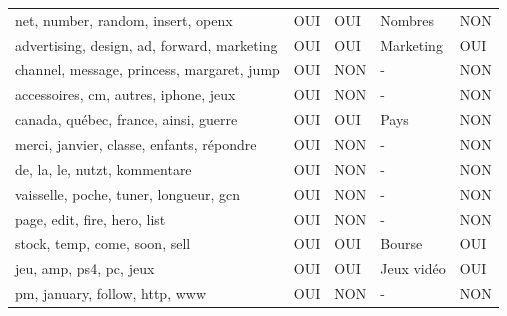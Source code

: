 \begin{longtable}{lllll}
\scriptsize net, number, random, insert, openx                 & \cellcolor[HTML]{9AFF99}OUI & \cellcolor[HTML]{9AFF99}OUI & Nombres                   & \cellcolor[HTML]{FFCCC9}NON \\
\scriptsize advertising, design, ad, forward, marketing        & \cellcolor[HTML]{9AFF99}OUI & \cellcolor[HTML]{9AFF99}OUI & Marketing                 & \cellcolor[HTML]{9AFF99}OUI \\
\scriptsize channel, message, princess, margaret, jump         & \cellcolor[HTML]{9AFF99}OUI & \cellcolor[HTML]{FFCCC9}NON & -                         & \cellcolor[HTML]{FFCCC9}NON \\
\scriptsize accessoires, cm, autres, iphone, jeux              & \cellcolor[HTML]{9AFF99}OUI & \cellcolor[HTML]{FFCCC9}NON & -                         & \cellcolor[HTML]{FFCCC9}NON \\
\scriptsize canada, québec, france, ainsi, guerre              & \cellcolor[HTML]{9AFF99}OUI & \cellcolor[HTML]{9AFF99}OUI & Pays                      & \cellcolor[HTML]{FFCCC9}NON \\
\scriptsize merci, janvier, classe, enfants, répondre          & \cellcolor[HTML]{9AFF99}OUI & \cellcolor[HTML]{FFCCC9}NON & -                         & \cellcolor[HTML]{FFCCC9}NON \\
\scriptsize de, la, le, nutzt, kommentare                      & \cellcolor[HTML]{9AFF99}OUI & \cellcolor[HTML]{FFCCC9}NON & -                         & \cellcolor[HTML]{FFCCC9}NON \\
\scriptsize vaisselle, poche, tuner, longueur, gcn             & \cellcolor[HTML]{9AFF99}OUI & \cellcolor[HTML]{FFCCC9}NON & -                         & \cellcolor[HTML]{FFCCC9}NON \\
\scriptsize page, edit, fire, hero, list                       & \cellcolor[HTML]{9AFF99}OUI & \cellcolor[HTML]{FFCCC9}NON & -                         & \cellcolor[HTML]{FFCCC9}NON \\
\scriptsize stock, temp, come, soon, sell                      & \cellcolor[HTML]{9AFF99}OUI & \cellcolor[HTML]{9AFF99}OUI & Bourse                    & \cellcolor[HTML]{9AFF99}OUI \\
\scriptsize jeu, amp, ps4, pc, jeux                            & \cellcolor[HTML]{9AFF99}OUI & \cellcolor[HTML]{9AFF99}OUI & Jeux vidéo                & \cellcolor[HTML]{9AFF99}OUI \\
\scriptsize pm, january, follow, http, www                     & \cellcolor[HTML]{9AFF99}OUI & \cellcolor[HTML]{FFCCC9}NON & -                         & \cellcolor[HTML]{FFCCC9}NON \\

\end{longtable}
